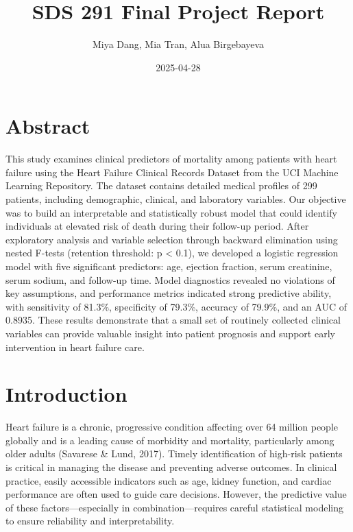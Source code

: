 \documentclass[
  letterpaper,
  DIV=11,
  numbers=noendperiod]{scrartcl}
\title{SDS 291 Final Project Report}
\author{Miya Dang, Mia Tran, Alua Birgebayeva}
\date{2025-04-28}
\begin{document}
\maketitle
\ifdefined\Shaded\renewenvironment{Shaded}{\begin{tcolorbox}[sharp corners, boxrule=0pt, interior hidden, frame hidden, borderline west={3pt}{0pt}{shadecolor}, enhanced, breakable]}{\end{tcolorbox}}\fi

\hypertarget{abstract}{%
\section{Abstract}\label{abstract}}

This study examines clinical predictors of mortality among patients with
heart failure using the Heart Failure Clinical Records Dataset from the
UCI Machine Learning Repository. The dataset contains detailed medical
profiles of 299 patients, including demographic, clinical, and
laboratory variables. Our objective was to build an interpretable and
statistically robust model that could identify individuals at elevated
risk of death during their follow-up period. After exploratory analysis
and variable selection through backward elimination using nested F-tests
(retention threshold: p \textless{} 0.1), we developed a logistic
regression model with five significant predictors: age, ejection
fraction, serum creatinine, serum sodium, and follow-up time. Model
diagnostics revealed no violations of key assumptions, and performance
metrics indicated strong predictive ability, with sensitivity of 81.3\%,
specificity of 79.3\%, accuracy of 79.9\%, and an AUC of 0.8935. These
results demonstrate that a small set of routinely collected clinical
variables can provide valuable insight into patient prognosis and
support early intervention in heart failure care.

\hypertarget{introduction}{%
\section{Introduction}\label{introduction}}

Heart failure is a chronic, progressive condition affecting over 64
million people globally and is a leading cause of morbidity and
mortality, particularly among older adults (Savarese \& Lund, 2017).
Timely identification of high-risk patients is critical in managing the
disease and preventing adverse outcomes. In clinical practice, easily
accessible indicators such as age, kidney function, and cardiac
performance are often used to guide care decisions. However, the
predictive value of these factors---especially in combination---requires
careful statistical modeling to ensure reliability and interpretability.
\end{document}
